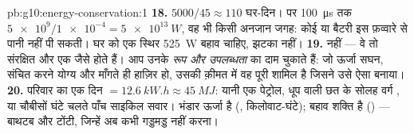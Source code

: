 \begin{solution}{pb:g10:energy-conservation:1}
\textbf{18.} $5000/45 \approx 110$ घर-दिन। पर \qty{100}{\micro s} तक $\num{5e9}/\num{1e-4} = \qty{5e13}{W}$, वह भी किसी अनजान
जगह: कोई  या बैटरी इस फ़व्वारे से पानी नहीं पी सकती।
घर को एक स्थिर \qty{525}{W} बहाव चाहिए, झटका नहीं।
\textbf{19.}  नहीं --- वे तो संरक्षित और एक जैसे होते हैं।
आप उनके \emph{रूप और उपलब्धता} का दाम चुकाते हैं: जो ऊर्जा सघन,
संचित करने योग्य और माँगते ही हाज़िर हो, उसकी क़ीमत में वह पूरी
 शामिल है जिसने उसे ऐसा बनाया।
\textbf{20.} परिवार का एक दिन $= \qty{12.6}{kW.h} \approx
\qty{45}{MJ}$: यानी एक 
पेट्रोल, धूप वाली छत के सोलह वर्ग , या चौबीसों घंटे चलते
पाँच साइकिल सवार। भंडार ऊर्जा है (,
किलोवाट-घंटे); बहाव शक्ति है () --- बाथटब
और टोंटी, जिन्हें अब कभी गड्डमड्ड नहीं करना।
\end{solution}
